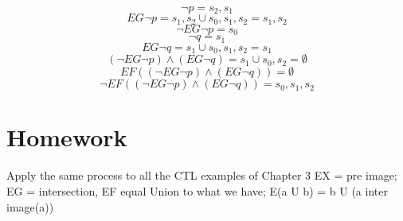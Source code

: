 \documentclass[11pt]{article}
\begin{document}
\[
	\lnot p = s_2, s_1
\]
\[
	EG \lnot p = s_1, s_2 \cup s_0, s_1, s_2  = s_1, s_2
\]
\[
	\lnot EG \lnot p = s_0
\]
\[
	\lnot q = s_1
\]
\[
	EG \lnot q = s_1 \cup s_0, s_1, s_2 = s_1		
\]
\[
	(\lnot EG \lnot p) \land (EG \lnot q) = s_1 \cup  s_0, s_2 = \emptyset
\]
\[
	EF((\lnot EG \lnot p) \land (EG \lnot q)) = \emptyset
\]
\[
	\lnot EF((\lnot EG \lnot p) \land (EG \lnot q)) = s_0, s_1, s_2		
\]


\section{Homework} %
\label{sec:homework}
Apply the same process to all the CTL examples of Chapter 3 
EX = pre image;  EG = intersection, EF equal Union to what we have; E(a U b) = b U (a inter image(a))
\end{document}
